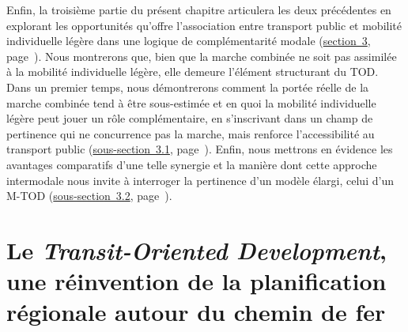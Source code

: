 \begin{refsegment}
Enfin, la troisième partie du présent chapitre articulera les deux précédentes en explorant les opportunités qu’offre l’association entre transport public et mobilité individuelle légère dans une logique de complémentarité modale (\hyperref[chap1:btod]{section~3}, page~\pageref{chap1:btod}). Nous montrerons que, bien que la marche combinée ne soit pas assimilée à la mobilité individuelle légère, elle demeure l’élément structurant du \acrshort{TOD}. Dans un premier temps, nous démontrerons comment la portée réelle de la marche combinée tend à être sous-estimée et en quoi la mobilité individuelle légère peut jouer un rôle complémentaire, en s’inscrivant dans un champ de pertinence qui ne concurrence pas la marche, mais renforce l’\gls{accessibilité} au transport public (\hyperref[chap1:btod-limites-tod]{sous-section~3.1}, page~\pageref{chap1:btod-limites-tod}). Enfin, nous mettrons en évidence les avantages comparatifs d’une telle synergie et la manière dont cette approche intermodale nous invite à interroger la pertinence d’un modèle élargi, celui d'un \acrfull{M-TOD} (\hyperref[chap1:btod-m-tod]{sous-section~3.2}, page~\pageref{chap1:btod-m-tod}).%

    \newpage
\section{Le \textsl{Transit-Oriented Development}, une réinvention de la planification régionale autour du chemin de fer
    \label{chap1:tod-presentation-generale}
    }


\end{refsegment}
